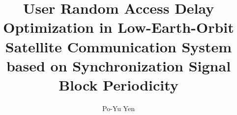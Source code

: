 \documentclass[12pt,oneandahalfspaced, a4paper]{tonic-thesis}
\title{User Random Access Delay Optimization in Low-Earth-Orbit Satellite Communication System based on Synchronization Signal Block Periodicity}
\author{Po-Yu Yen}
\numberwithin{equation}{chapter} %
\begin{document}
\begin{preliminary}

\begin{abstract}

\end{abstract}

\contents

\end{preliminary}










\begin{postliminary}




\end{postliminary}
\end{document}
